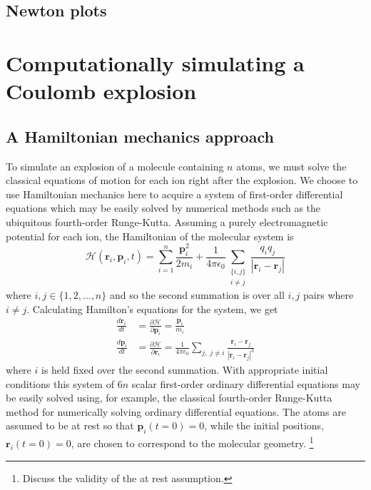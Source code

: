 \subsection{Newton plots}

\section{Computationally simulating a Coulomb explosion} \label{sec:simulating}

\subsection{A Hamiltonian mechanics approach}
To simulate an explosion of a molecule containing $n$ atoms, we must solve the classical equations of motion for each ion right after the explosion. We choose to use Hamiltonian mechanics here to acquire a system of first-order differential equations which may be easily solved by numerical methods such as the ubiquitous fourth-order Runge-Kutta. Assuming a purely electromagnetic potential for each ion, the Hamiltonian of the molecular system is
\begin{equation}
\mathcal{H}(\mathbf{r}_i, \mathbf{p}_i, t) = \sum_{i=1}^n \frac{\mathbf{p}_i^2}{2m_i} + \frac{1}{4\pi\epsilon_0}\sum_{\substack{\lbrace i,j\rbrace\\ i \ne j}} \frac{q_iq_j}{|\mathbf{r}_i-\mathbf{r}_j|}
\end{equation}
where $i,j \in \lbrace 1,2,\dots, n \rbrace$ and so the second summation is over all $i,j$ pairs where $i \ne j$. Calculating Hamilton's equations for the system, we get
\begin{subequations}
  \begin{align}
  \frac{d\mathbf{r}_i}{dt} &= \frac{\partial \mathcal{H}}{\partial \mathbf{p}_i} = \frac{\mathbf{p}_i}{m_i} \\
  \frac{d\mathbf{p}_i}{dt} &= \frac{\partial \mathcal{H}}{\partial \mathbf{r}_i} = \frac{1}{4\pi\epsilon_0}\sum_{j, \; j \ne i} \frac{\mathbf{r}_i - \mathbf{r}_j}{|\mathbf{r}_i - \mathbf{r}_j|^3}
  \end{align}
\end{subequations}
where $i$ is held fixed over the second summation. With appropriate initial conditions this system of $6n$ scalar first-order ordinary differential equations may be easily solved using, for example, the classical fourth-order Runge-Kutta method for numerically solving ordinary differential equations. The atoms are assumed to be at rest so that $\mathbf{p}_i(t=0) = 0$, while the initial positions, $\mathbf{r}_i(t=0) = 0$, are chosen to correspond to the molecular geometry. \footnote{Discuss the validity of the at rest assumption.}

